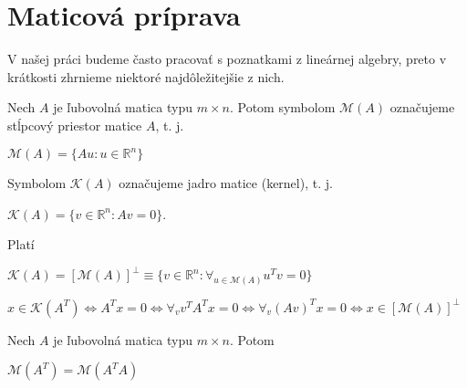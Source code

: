 \section{Maticová príprava}
\label{matrix algebra}

V našej práci budeme často pracovať s poznatkami z lineárnej algebry, preto v krátkosti zhrnieme niektoré najdôležitejšie z nich.

\begin{defin}
Nech $A$ je ľubovolná matica typu $m \times n$. Potom symbolom $\mathcal{M}(A)$ označujeme stĺpcový priestor matice $A$, t. j.
\begin{center}
$
\mathcal{M}(A) = \{ Au : u \in \mathbb{R}^n \}
$
\end{center}
Symbolom $\mathcal{K}(A)$ označujeme jadro matice (kernel), t. j.
\begin{center}
$
\mathcal{K}(A) = \{ v \in \mathbb{R}^n : Av = 0 \}
$.
\end{center}
\end{defin}

\begin{lema}
Platí
\begin{center}
$
\mathcal{K}(A) = [\mathcal{M}(A)]^{\perp} \equiv \{ v \in \mathbb{R}^n : {\forall}_{u \in \mathcal{M}(A)} u^T v = 0 \}
$
\end{center}
\end{lema}

\begin{dokaz}


\begin{center}
$
x \in \mathcal{K}(A^T) \Leftrightarrow A^T x = 0 \Leftrightarrow {\forall}_v v^T A^T x = 0 \Leftrightarrow {\forall}_v (Av)^Tx = 0 \Leftrightarrow x \in [\mathcal{M}(A)]^{\perp}
$
\end{center}
\end{dokaz}

\begin{lema}
\label{o stlpcovych priestoroch}
Nech $A$ je ľubovolná matica typu $m \times n$. Potom
\begin{center}
$\mathcal{M}(A^T) = \mathcal{M}(A^T A)$
\end{center}
\end{lema}

